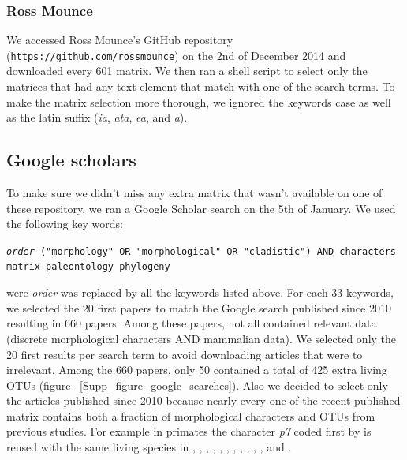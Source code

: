 \subsubsection{Ross Mounce}
We accessed Ross Mounce's GitHub repository (\texttt{https://github.com/rossmounce}) on the 2nd of December 2014 and downloaded every 601 matrix. We then ran a shell script to select only the matrices that had any text element that match with one of the search terms. To make the matrix selection more thorough, we ignored the keywords case as well as the latin suffix (\textit{ia}, \textit{ata}, \textit{ea}, and \textit{a}).

\subsection{Google scholars}
To make sure we didn't miss any extra matrix that wasn't available on one of these repository, we ran a Google Scholar search on the 5th of January. We used the following key words:

\texttt{\textit{order} ("morphology" OR "morphological" OR "cladistic") AND characters matrix paleontology phylogeny}

were \textit{order} was replaced by all the keywords listed above. For each 33 keywords, we selected the 20 first papers to match the Google search published since 2010 resulting in 660 papers. Among these papers, not all contained relevant data (discrete morphological characters AND mammalian data). We selected only the 20 first results per search term to avoid downloading articles that were to irrelevant. Among the 660 papers, only 50 contained a total of 425 extra living OTUs (figure ~\ref{Supp_figure_google_searches}).
Also we decided to select only the articles published since 2010 because nearly every one of the recent published matrix contains both a fraction of morphological characters and OTUs from previous studies. For example in primates the character \textit{p7} coded first by \cite{ross1998phylogenetic} is reused with the same living species in \cite{seiffert2003fossil}, \cite{marivaux2005anthropoid}, \cite{seiffert2005basal}, \cite{bloch2007new}, \cite{bloch2007new}, \cite{kay2008anatomy}, \cite{silcox2008biogeographic}, \cite{seiffert2009convergent}, \cite{tabuce2009anthropoid}, \cite{boyer2010astragalar}, \cite{seiffert2010fossil}, \cite{marivaux2013djebelemur} and \cite{ni2013oldest}.

